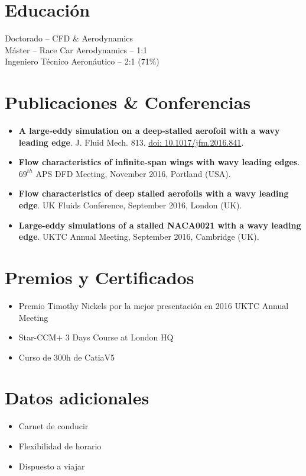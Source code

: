 \documentclass[fontsize=10pt]{tccv_esp}
\begin{document}
\section{Educaci\'on}
\begin{eventlist}
     	{\normalsize{Doctorado -- CFD \& Aerodynamics}} \\

\vspace{-8pt}
     	{\normalsize{M\'aster -- Race Car Aerodynamics -- 1:1}} \\

\vspace{-8pt}
	{\normalsize{Ingeniero T\'ecnico Aeron\'autico -- 2:1 (71\%)}}
\end{eventlist}

\vspace{-25pt}
\section{Publicaciones \& Conferencias} 
  	\begin{itemize}
	\itemsep -2pt
\item \textbf{A large-eddy simulation on a deep-stalled aerofoil with a wavy leading edge}. J. Fluid Mech. 813. \href{https://doi.org/10.1017/jfm.2016.841}{doi: 10.1017/jfm.2016.841}.
\item \textbf{Flow characteristics of infinite-span wings with wavy leading edges}. $69^{th}$ APS DFD Meeting, November 2016, Portland (USA). 
\item \textbf{Flow characteristics of deep stalled aerofoils with a wavy
leading edge}. UK Fluids Conference, September 2016, London (UK). 
\item \textbf{Large-eddy simulations of a stalled NACA0021 with a wavy
leading edge}. UKTC Annual Meeting, September 2016, Cambridge (UK).
	\end{itemize}

\vspace{-25pt}
\section{Premios y Certificados} 
  	\begin{itemize}
	\itemsep -2pt
	\item Premio Timothy Nickels por la mejor presentaci\'on en 2016 UKTC Annual Meeting
	\item Star-CCM+ 3 Days Course at London HQ
	\item Curso de 300h de CatiaV5 
	\end{itemize}

\vspace{-22pt}
\section{Datos adicionales} 
\begin{itemize}
	\itemsep -2pt
	\item Carnet de conducir
	\item Flexibilidad de horario
	\item Dispuesto a viajar
\end{itemize}
\end{document}
